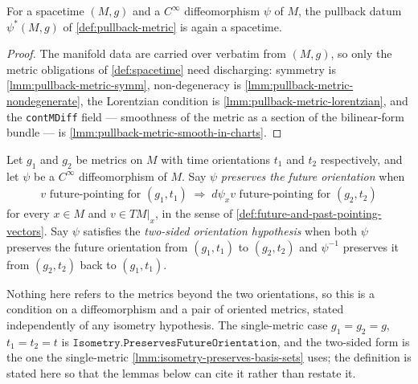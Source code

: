 \begin{theorem}
    \label{thrm:pullback-is-spacetime}
    \leanok
    For a spacetime $(M,g)$ and a $C^\infty$ diffeomorphism $\psi$ of $M$, the pullback datum $\psi^*(M,g)$ of \ref{def:pullback-metric} is again a spacetime.
\end{theorem}
\begin{proof}
    \leanok
    The manifold data are carried over verbatim from $(M,g)$, so only the metric obligations of \ref{def:spacetime} need discharging: symmetry is \ref{lmm:pullback-metric-symm}, non-degeneracy is \ref{lmm:pullback-metric-nondegenerate}, the Lorentzian condition is \ref{lmm:pullback-metric-lorentzian}, and the \texttt{contMDiff} field --- smoothness of the metric as a section of the bilinear-form bundle --- is \ref{lmm:pullback-metric-smooth-in-charts}.
\end{proof}

\begin{definition}
    \label{def:preserves-future-orientation}
    \leanok
    Let $g_1$ and $g_2$ be metrics on $M$ with time orientations $t_1$ and $t_2$ respectively, and let $\psi$ be a $C^\infty$ diffeomorphism of $M$. Say $\psi$ \emph{preserves the future orientation} when
    \begin{align}
        v \text{ future-pointing for } (g_1,t_1) \;\Longrightarrow\; d\psi_x v \text{ future-pointing for } (g_2,t_2)
    \end{align}
    for every $x \in M$ and $v \in TM|_x$, in the sense of \ref{def:future-and-past-pointing-vectors}. Say $\psi$ satisfies the \emph{two-sided orientation hypothesis} when both $\psi$ preserves the future orientation from $(g_1,t_1)$ to $(g_2,t_2)$ and $\psi^{-1}$ preserves it from $(g_2,t_2)$ back to $(g_1,t_1)$.

    Nothing here refers to the metrics beyond the two orientations, so this is a condition on a diffeomorphism and a pair of oriented metrics, stated independently of any isometry hypothesis. The single-metric case $g_1 = g_2 = g$, $t_1 = t_2 = t$ is $\mathtt{Isometry.PreservesFutureOrientation}$, and the two-sided form is the one the single-metric \ref{lmm:isometry-preserves-basis-sets} uses; the definition is stated here so that the lemmas below can cite it rather than restate it.
\end{definition}

